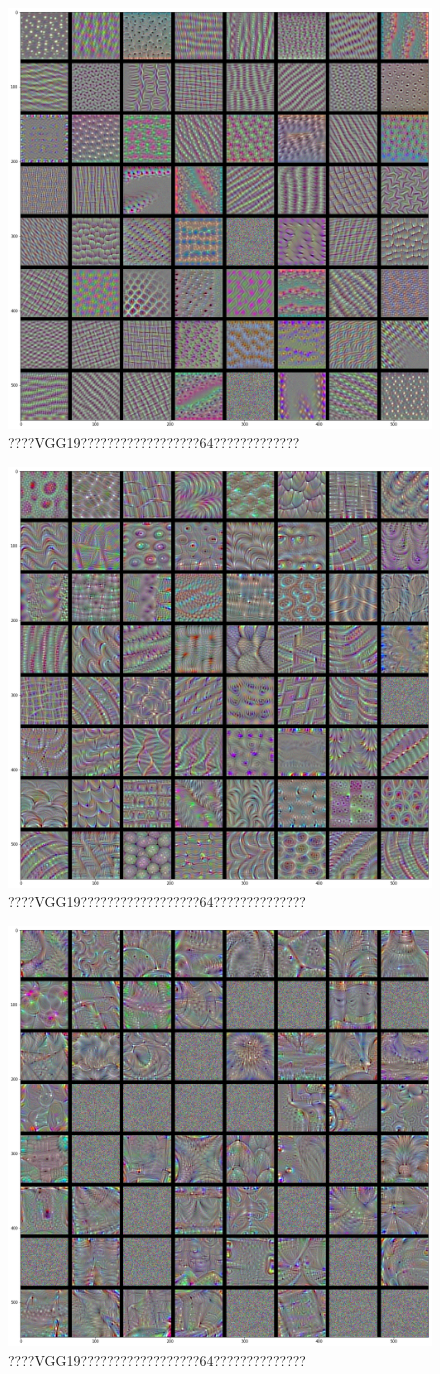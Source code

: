 \documentclass[lang=cn,11pt]{elegantpaper}
\begin{document}
\begin{figure}
	\centering
	\includegraphics[width=0.6\linewidth]
	{block3_conv1}
	\caption{????VGG19??????????????????64?????????????\label{fig:filter3}}
\end{figure}
\begin{figure}
	\centering
  \includegraphics[width=0.6\linewidth]{block4_conv1}
  \caption{????VGG19??????????????????64??????????????\label{fig:filter4}}
\end{figure}
\begin{figure}
\centering
  \includegraphics[width=0.6\linewidth]{block5_conv1.png}
  \caption{????VGG19??????????????????64??????????????\label{fig:filter5}}
\end{figure}
\end{document}
